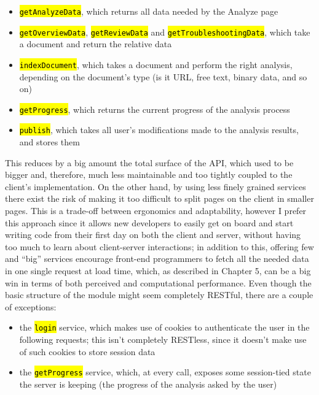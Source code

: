\documentclass[12pt,svgnames]{memoir}
\let\OldTexttt\texttt
\renewcommand{\texttt}[1]{\OldTexttt{\hl{#1}}}
\begin{document}
\begin{itemize}
\itemsep1pt\parskip0pt
\item
  \texttt{getAnalyzeData}, which returns all data needed by the Analyze
  page
\item
  \texttt{getOverviewData}, \texttt{getReviewData} and
  \texttt{getTroubleshootingData}, which take a document and return the
  relative data
\item
  \texttt{indexDocument}, which takes a document and perform the right
  analysis, depending on the document's type (is it URL, free text,
  binary data, and so on)
\item
  \texttt{getProgress}, which returns the current progress of the
  analysis process
\item
  \texttt{publish}, which takes all user's modifications made to the
  analysis results, and stores them
\end{itemize}

This reduces by a big amount the total surface of the API, which used to
be bigger and, therefore, much less maintainable and too tightly coupled
to the client's implementation. On the other hand, by using less finely
grained services there exist the risk of making it too difficult to
split pages on the client in smaller pages. This is a trade-off between
ergonomics and adaptability, however I prefer this approach since it
allows new developers to easily get on board and start writing code from
their first day on both the client and server, without having too much
to learn about client-server interactions; in addition to this, offering
few and ``big'' services encourage front-end programmers to fetch all
the needed data in one single request at load time, which, as described
in Chapter 5, can be a big win in terms of both perceived and
computational performance. Even though the basic structure of the module
might seem completely RESTful, there are a couple of exceptions:

\begin{itemize}
\itemsep1pt\parskip0pt
\item
  the \texttt{login} service, which makes use of cookies to authenticate
  the user in the following requests; this isn't completely RESTless,
  since it doesn't make use of such cookies to store session data
\item
  the \texttt{getProgress} service, which, at every call, exposes some
  session-tied state the server is keeping (the progress of the analysis
  asked by the user)
\end{itemize}
\end{document}
